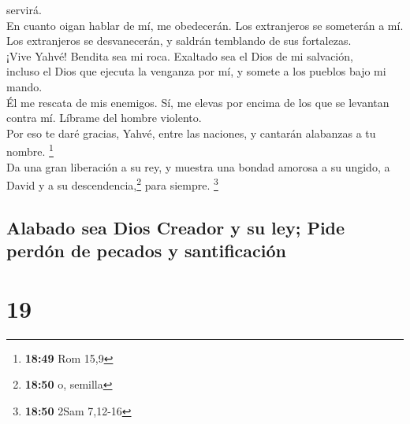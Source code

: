 servirá.\\
 En cuanto oigan hablar de mí, me obedecerán. Los
extranjeros se someterán a mí.\\
 Los extranjeros se desvanecerán, y saldrán temblando de
sus fortalezas.\\
 ¡Vive Yahvé! Bendita sea mi roca. Exaltado sea el Dios
de mi salvación,\\
 incluso el Dios que ejecuta la venganza por mí, y somete
a los pueblos bajo mi mando.\\
 Él me rescata de mis enemigos. Sí, me elevas por encima
de los que se levantan contra mí. Líbrame del hombre violento.\\
 Por eso te daré gracias, Yahvé, entre las naciones, y
cantarán alabanzas a tu nombre. \footnote{\textbf{18:49} Rom 15,9}\\
 Da una gran liberación a su rey, y muestra una bondad
amorosa a su ungido, a David y a su descendencia,\footnote{\textbf{18:50}
  o, semilla} para siempre. \footnote{\textbf{18:50} 2Sam 7,12-16}

\hypertarget{alabado-sea-dios-creador-y-su-ley-pide-perduxf3n-de-pecados-y-santificaciuxf3n}{%
\subsection{Alabado sea Dios Creador y su ley; Pide perdón de pecados y
santificación}\label{alabado-sea-dios-creador-y-su-ley-pide-perduxf3n-de-pecados-y-santificaciuxf3n}}

\hypertarget{section-18}{%
\section{19}\label{section-18}}

